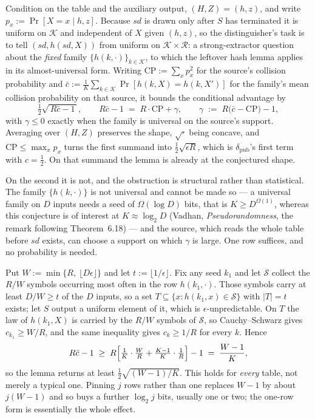 \documentclass{aicr-conjecture}
\newcommand{\sd}{\mathit{sd}}
\newcommand{\calK}{\mathcal{K}}
\newcommand{\calR}{\mathcal{R}}
\begin{document}
\begin{remark}\label{rem:lhl}
Condition on the table and the auxiliary output, $(H,Z) = (h,z)$, and write
$p_x := \Pr[X = x \mid h,z]$. Because $\sd$ is drawn only after $S$ has terminated it is uniform on
$\calK$ and independent of $X$ given $(h,z)$, so the distinguisher's task is to tell
$(\sd, h(\sd,X))$ from uniform on $\calK \times \calR$: a strong-extractor question about the
\emph{fixed} family $\{h(k,\cdot)\}_{k \in \calK}$, to which the leftover hash lemma applies in its
almost-universal form. Writing $\mathrm{CP} := \sum_x p_x^2$ for the source's collision probability
and $\bar c := \tfrac1K \sum_{k \in \calK} \Pr[h(k,X) = h(k,X')]$ for the family's mean collision
probability on that source, it bounds the conditional advantage by
\[
  \tfrac12\sqrt{\,R\bar c - 1\,}, \qquad R\bar c - 1 \;=\; R\cdot\mathrm{CP} + \gamma,
  \qquad \gamma \;:=\; R\bigl(\bar c - \mathrm{CP}\bigr) - 1 ,
\]
with $\gamma \le 0$ exactly when the family is universal on the source's support. Averaging over
$(H,Z)$ preserves the shape, $\sqrt{\cdot}$ being concave, and $\mathrm{CP} \le \max_x p_x$ turns
the first summand into $\tfrac12\sqrt{\epsilon R}$, which is $\delta_{\mathrm{pub}}$'s first term
with $c = \tfrac12$. On that summand the lemma is already at the conjectured shape.

On the second it is not, and the obstruction is structural rather than statistical. The family
$\{h(k,\cdot)\}$ is not universal and cannot be made so --- a universal family on $D$ inputs needs a
seed of $\Omega(\log D)$ bits, that is $K \ge D^{\Omega(1)}$, whereas this conjecture is of interest
at $K \approx \log_2 D$ (Vadhan, \emph{Pseudorandomness}, the remark following Theorem~6.18) --- and
the source, which reads the whole table before $\sd$ exists, can choose a support on which $\gamma$
is large. One row suffices, and no probability is needed.

Put $W := \min\{R,\ \lfloor D\epsilon \rfloor\}$ and let $t := \lfloor 1/\epsilon \rfloor$. Fix any
seed $k_1$ and let $\mathcal{S}$ collect the $R/W$ symbols occurring most often in the row
$h(k_1,\cdot)$. Those symbols carry at least $D/W \ge t$ of the $D$ inputs, so a set
$T \subseteq \{x : h(k_1,x) \in \mathcal{S}\}$ with $|T| = t$ exists; let $S$ output a uniform
element of it, which is $\epsilon$-unpredictable. On $T$ the law of $h(k_1,X)$ is carried by the
$R/W$ symbols of $\mathcal{S}$, so Cauchy--Schwarz gives $c_{k_1} \ge W/R$, and the same inequality
gives $c_k \ge 1/R$ for every $k$. Hence
\[
  R\bar c - 1 \;\ge\; R\Bigl[\tfrac1K\cdot\tfrac{W}{R} + \tfrac{K-1}{K}\cdot\tfrac1R\Bigr] - 1
  \;=\; \frac{W-1}{K} ,
\]
so the lemma returns at least $\tfrac12\sqrt{(W-1)/K}$. This holds for \emph{every} table, not merely a typical one. Pinning $j$ rows rather than one
replaces $W-1$ by about $j(W-1)$ and so buys a further $\log_2 j$ bits, usually one or two; the
one-row form is essentially the whole effect.


\end{remark}
\end{document}

